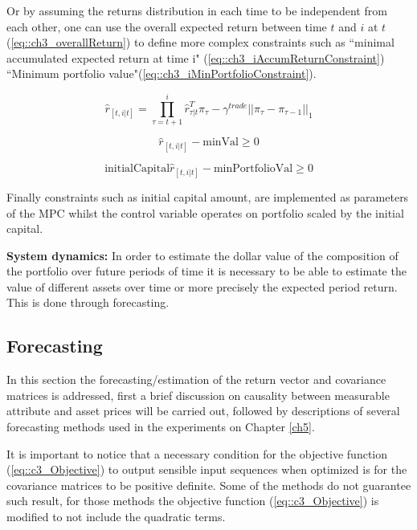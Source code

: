 Or by assuming the returns distribution in each time to be independent from each other, one can use the overall expected return between time $t$ and $i$ at $t$ (\ref{eq::ch3_overallReturn}) to define more complex constraints such as ``minimal accumulated expected return at time i" (\ref{eq::ch3_iAccumReturnConstraint})
``Minimum portfolio value"(\ref{eq::ch3_iMinPortfolioConstraint}).


\begin{equation}\label{eq::ch3_overallReturn}
    \hat{r}_{[t,i|t]}=\prod_{\tau=t+1}^{i} \hat{r}^{T}_{\tau|t}\pi_{\tau} - \gamma^{trade}||\pi_{\tau}-\pi_{\tau-1}||_1 
\end{equation}

\begin{equation}\label{eq::ch3_iAccumReturnConstraint}
    \hat{r}_{[t,i|t]} - \text{minVal} \geq 0
\end{equation}


\begin{equation}\label{eq::ch3_iMinPortfolioConstraint}
   \text{initialCapital} \hat{r}_{[t,i|t]} - \text{minPortfolioVal} \geq 0
\end{equation}

Finally constraints such as initial capital amount, are implemented as parameters of the MPC whilst the control variable operates on portfolio scaled by the initial capital. 

\textbf{System dynamics:}
In order to estimate the dollar value of the composition of the portfolio over future periods of time it is necessary to be able to estimate the value of different assets over time or more precisely the expected period return. This is done through forecasting.

\subsection{Forecasting}

In this section the forecasting/estimation of the return vector and covariance matrices is addressed, first a brief discussion on causality between measurable attribute and asset prices will be carried out, followed by descriptions of several forecasting methods used in the experiments on Chapter \ref{ch5}.

It is important to notice that a necessary condition for the objective function (\ref{eq::c3_Objective}) to output sensible input sequences when optimized is for the covariance matrices to be positive definite. Some of the methods do not guarantee such result, for those methods the objective function (\ref{eq::c3_Objective}) is modified to not include the quadratic terms.

